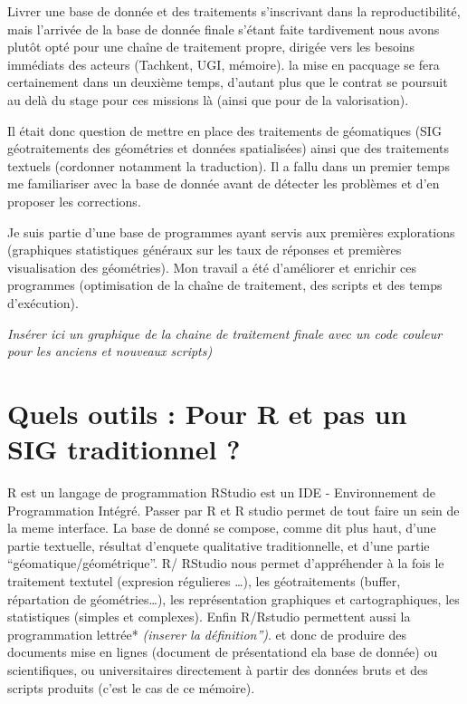 \documentclass[
  12pt,
  a4paperpaper,
]{book}
\begin{document}
Livrer une base de donnée et des traitements s'inscrivant dans la
reproductibilité, mais l'arrivée de la base de donnée finale s'étant
faite tardivement nous avons plutôt opté pour une chaîne de traitement
propre, dirigée vers les besoins immédiats des acteurs (Tachkent, UGI,
mémoire). la mise en pacquage se fera certainement dans un deuxième
temps, d'autant plus que le contrat se poursuit au delà du stage pour
ces missions là (ainsi que pour de la valorisation).

Il était donc question de mettre en place des traitements de géomatiques
(SIG géotraitements des géométries et données spatialisées) ainsi que
des traitements textuels (cordonner notamment la traduction). Il a fallu
dans un premier temps me familiariser avec la base de donnée avant de
détecter les problèmes et d'en proposer les corrections.

Je suis partie d'une base de programmes ayant servis aux premières
explorations (graphiques statistiques généraux sur les taux de réponses
et premières visualisation des géométries). Mon travail a été
d'améliorer et enrichir ces programmes (optimisation de la chaîne de
traitement, des scripts et des temps d'exécution).

\emph{Insérer ici un graphique de la chaine de traitement finale avec un
code couleur pour les anciens et nouveaux scripts)}

\hypertarget{quels-outils-pour-r-et-pas-un-sig-traditionnel}{%
\section{Quels outils : Pour R et pas un SIG traditionnel
?}\label{quels-outils-pour-r-et-pas-un-sig-traditionnel}}

R est un langage de programmation RStudio est un IDE - Environnement de
Programmation Intégré. Passer par R et R studio permet de tout faire un
sein de la meme interface. La base de donné se compose, comme dit plus
haut, d'une partie textuelle, résultat d'enquete qualitative
traditionnelle, et d'une partie ``géomatique/géométrique''. R/ RStudio
nous permet d'appréhender à la fois le traitement textutel (expresion
régulieres \ldots), les géotraitements (buffer, répartation de
géométries\ldots), les représentation graphiques et cartographiques, les
statistiques (simples et complexes). Enfin R/Rstudio permettent aussi la
programmation lettrée* \emph{(inserer la définition'')}. et donc de
produire des documents mise en lignes (document de présentationd ela
base de donnée) ou scientifiques, ou universitaires directement à partir
des données bruts et des scripts produits (c'est le cas de ce mémoire).
\end{document}
